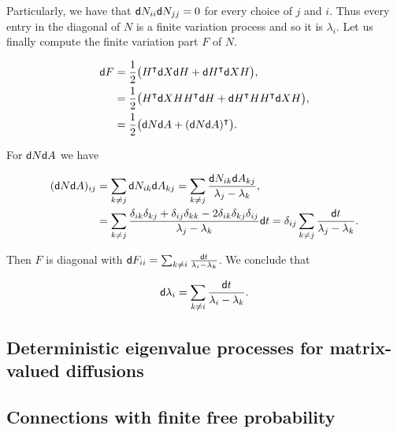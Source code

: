 Particularly, we have that $\mathsf d N_{ii}\mathsf d N_{jj} = 0$ for every choice of $j$ and $i$. Thus every entry in the diagonal of $N$ is a finite variation process and so it is $\lambda_i$. Let us finally compute the finite variation part $F$ of $N$.

\begin{align*}
    \mathsf d F &= \frac12 \bigl( H^{\intercal}\mathsf d X \mathsf d H + \mathsf d H^{\intercal}\mathsf d X H \bigr),\\
         &= \frac12 \bigl( H^{\intercal}\mathsf d X H H^{\intercal} \mathsf d H + \mathsf d H^{\intercal}HH^{\intercal}\mathsf d X H \bigr),\\
         &= \frac12 \bigl( \mathsf d N \mathsf d A + (\mathsf d N \mathsf d A)^{\intercal} \bigr).
\end{align*}

For $\mathsf d N \mathsf d A$ we have

\begin{align*}
    (\mathsf d N \mathsf d A)_{ij} &= \sum_{k\neq j} \mathsf d N_{ik}\mathsf d A_{kj} = \sum_{k\neq j} \frac{\mathsf d N_{ik}\mathsf d A_{kj}}{\lambda_j - \lambda_k},\\
    &= \sum_{k\neq j} \frac{ \delta_{ik}\delta_{kj} + \delta_{ij}\delta_{kk} - 2\delta_{ik}\delta_{kj}\delta_{ij} }{\lambda_j - \lambda_k}\mathsf d t = \delta_{ij}\sum_{k\neq j} \frac{ \mathsf d t }{\lambda_j - \lambda_k}.
\end{align*}

Then $F$ is diagonal with $\mathsf d F_{ii} = \sum_{k\neq i} \frac{\mathsf d t}{\lambda_i - \lambda_k}$. We conclude that

\begin{equation*}
    \mathsf d \lambda_i = \sum_{k\neq i} \frac{\mathsf d t}{\lambda_i - \lambda_k}.
\end{equation*}

\subsection{Deterministic eigenvalue processes for matrix-valued diffusions}


\subsection{Connections with finite free probability}


